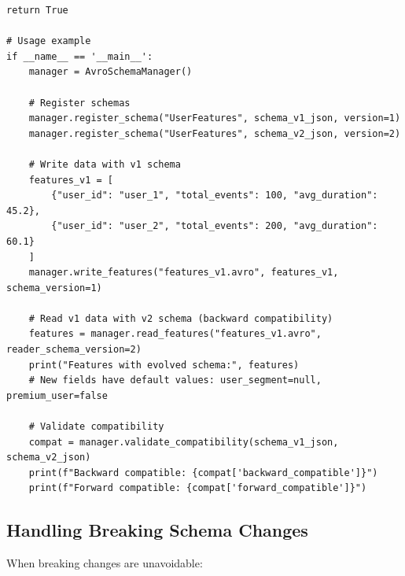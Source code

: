 \begin{lstlisting}[style=python, caption=Schema evolution with Apache Avro]
        return True

# Usage example
if __name__ == '__main__':
    manager = AvroSchemaManager()

    # Register schemas
    manager.register_schema("UserFeatures", schema_v1_json, version=1)
    manager.register_schema("UserFeatures", schema_v2_json, version=2)

    # Write data with v1 schema
    features_v1 = [
        {"user_id": "user_1", "total_events": 100, "avg_duration": 45.2},
        {"user_id": "user_2", "total_events": 200, "avg_duration": 60.1}
    ]
    manager.write_features("features_v1.avro", features_v1, schema_version=1)

    # Read v1 data with v2 schema (backward compatibility)
    features = manager.read_features("features_v1.avro", reader_schema_version=2)
    print("Features with evolved schema:", features)
    # New fields have default values: user_segment=null, premium_user=false

    # Validate compatibility
    compat = manager.validate_compatibility(schema_v1_json, schema_v2_json)
    print(f"Backward compatible: {compat['backward_compatible']}")
    print(f"Forward compatible: {compat['forward_compatible']}")
\end{lstlisting}

\subsection{Handling Breaking Schema Changes}

When breaking changes are unavoidable:


